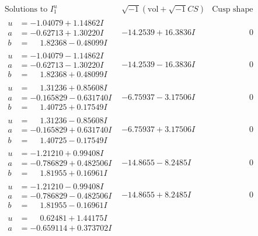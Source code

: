 \documentclass[1p]{elsarticle_modified}
\theoremstyle{definition}
\newcommand{\I}{\sqrt{-1}}
\begin{document}
$$\begin{array}{c|c|c}
\text{Solutions to }I^u_{1}& \I (\text{vol} + \sqrt{-1}CS) & \text{Cusp shape}\\
 \hline 
\begin{aligned}
u &= -1.04079 + 1.14862 I \\
a &= -0.62713 + 1.30220 I \\
b &= \phantom{-}1.82368 - 0.48099 I\end{aligned}
 & -14.2539 + 16.3836 I & \phantom{-0.000000 } 0 \\ \hline\begin{aligned}
u &= -1.04079 - 1.14862 I \\
a &= -0.62713 - 1.30220 I \\
b &= \phantom{-}1.82368 + 0.48099 I\end{aligned}
 & -14.2539 - 16.3836 I & \phantom{-0.000000 } 0 \\ \hline\begin{aligned}
u &= \phantom{-}1.31236 + 0.85608 I \\
a &= -0.165829 - 0.631740 I \\
b &= \phantom{-}1.40725 + 0.17549 I\end{aligned}
 & -6.75937 - 3.17506 I & \phantom{-0.000000 } 0 \\ \hline\begin{aligned}
u &= \phantom{-}1.31236 - 0.85608 I \\
a &= -0.165829 + 0.631740 I \\
b &= \phantom{-}1.40725 - 0.17549 I\end{aligned}
 & -6.75937 + 3.17506 I & \phantom{-0.000000 } 0 \\ \hline\begin{aligned}
u &= -1.21210 + 0.99408 I \\
a &= -0.786829 + 0.482506 I \\
b &= \phantom{-}1.81955 + 0.16961 I\end{aligned}
 & -14.8655 - 8.2485 I & \phantom{-0.000000 } 0 \\ \hline\begin{aligned}
u &= -1.21210 - 0.99408 I \\
a &= -0.786829 - 0.482506 I \\
b &= \phantom{-}1.81955 - 0.16961 I\end{aligned}
 & -14.8655 + 8.2485 I & \phantom{-0.000000 } 0 \\ \hline\begin{aligned}
u &= \phantom{-}0.62481 + 1.44175 I \\
a &= -0.659114 + 0.373702 I \\

\end{aligned}
\end{array}$$
\end{document}

